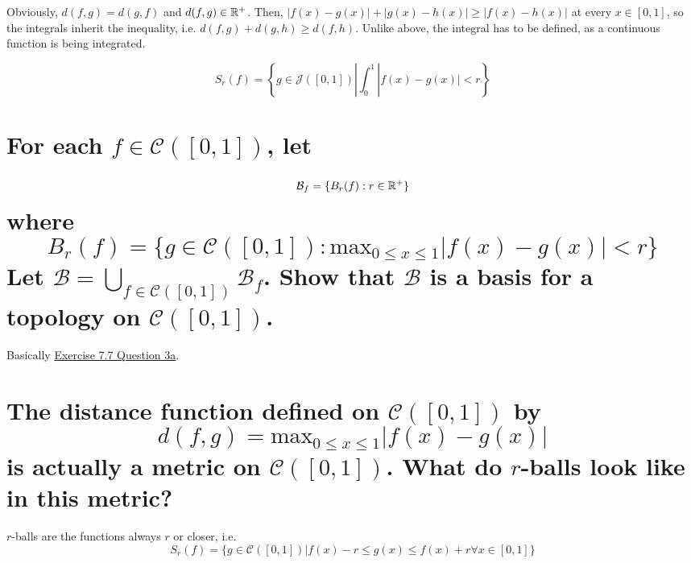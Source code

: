 
\begin{solution}
Obviously, $d(f,g) = d(g,f)$ and $d(f,g) \in \mathbb{R}^+$. Then, $|f(x) - g(x)| + |g(x) - h(x)| \geq |f(x) - h(x)|$ at every $x \in [0,1]$, so the integrals inherit the inequality, i.e. $d(f,g) + d(g,h) \geq d(f,h)$. Unlike above, the integral has to be defined, as a continuous function is being integrated.
\end{solution}


\begin{solution}
$$S_r(f) = \left\{g \in \mathcal{J}([0,1])|\int_0^1 |f(x) - g(x)| < r\right\}$$
\end{solution}


\begin{parts}
\part{For each $f \in \mathcal{C}([0,1])$, let $$\mathcal{B}_f = \{B_r(f): r \in \mathbb{R}^+\}$$ where $$B_r(f) = \{g \in \mathcal{C}([0,1]): \mathrm{max}_{0\leq x\leq 1} |f(x) - g(x)| < r\}$$ Let $\mathcal{B} = \bigcup_{f\in\mathcal{C}([0,1])} \mathcal{B}_f$. Show that $\mathcal{B}$ is a basis for a topology on $\mathcal{C}([0,1])$.}

\begin{solution}
Basically \hyperref[q4.7.7.3a]{Exercise 7.7 Question 3a}.
\end{solution}

\part{The distance function defined on $\mathcal{C}([0,1])$ by $$d(f,g) = \mathrm{max}_{0\leq x\leq 1}|f(x) - g(x)|$$ is actually a metric on $\mathcal{C}([0,1])$. What do $r$-balls look like in this metric?}

\begin{solution}
$r$-balls are the functions always $r$ or closer, i.e.
$$S_r(f) = \{g \in \mathcal{C}([0,1])| f(x)-r \leq g(x) \leq f(x)+r \forall x \in [0,1]\}$$
\end{solution}

\end{parts}
